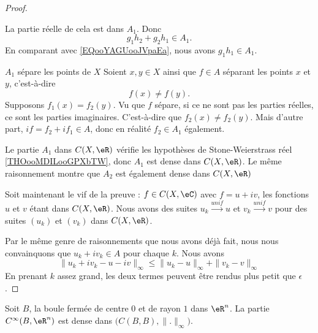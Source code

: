 \begin{proof}
\begin{subproof}
\begin{equation}
            \end{equation}
            La partie réelle de cela est dans \( A_1\). Donc
            \begin{equation}
                g_1h_2+g_2h_1\in A_1.
            \end{equation}
            En comparant avec \eqref{EQooYAGUooJVpaEa}, nous avons \( g_1h_1\in A_1\).
        \item[\( A_1\) sépare les points de \( X\)]
            Soient \( x,y\in X\) ainsi que \( f\in A\) séparant les points \( x\) et \( y\), c'est-à-dire
            \begin{equation}
                f(x)\neq f(y).
            \end{equation}
            Supposons \( f_1(x)=f_2(y)\). Vu que \( f\) sépare, si ce ne sont pas les parties réelles, ce sont les parties imaginaires. C'est-à-dire que  \( f_2(x)\neq f_2(y)\). Mais d'autre part, \( if=f_2+if_1\in A\),  donc en réalité \( f_2\in A_1\) également.
    \end{subproof}
    Le partie \( A_1\) dans \( C(X,\eR)\) vérifie les hypothèses de Stone-Weierstrass réel \ref{THOooMDILooGPXbTW}, donc \( A_1\) est dense dans \( C(X,\eR)\). Le même raisonnement montre que \( A_2\) est également dense dans \( C(X,\eR)\)

    Soit maintenant le vif de la preuve : \( f\in C(X,\eC)\) avec \( f=u+iv\), les fonctions \( u\) et \( v \) étant dans \( C(X,\eR)\). Nous avons des suites \( u_{k}\stackrel{unif}{\longrightarrow}u\) et \( v_k\stackrel{unif}{\longrightarrow}v\) pour des suites \( (u_k) \) et \( (v_k)\) dans \( C(X,\eR)\).

    Par le même genre de raisonnements que nous avons déjà fait, nous nous convainquons que \( u_k+iv_k\in A\) pour chaque \( k\). Nous avons
    \begin{equation}
        \| u_k+iv_k-u-iv \|_{\infty}\leq \| u_k-u \|_{\infty}+\| v_k-v \|_{\infty}
    \end{equation}
    En prenant \( k\) assez grand, les deux termes peuvent être rendus plus petit que \( \epsilon\).
\end{proof}

\begin{corollary}        \label{CORooNIUJooLDrPSv}
    Soit \( B\), la boule fermée de centre \( 0\) et de rayon \( 1\) dans \( \eR^n\). La partie \( C^{\infty}(B,\eR^n)\) est dense dans \( \big( C(B,B),\| . \|_{\infty} \big)\).
\end{corollary}

